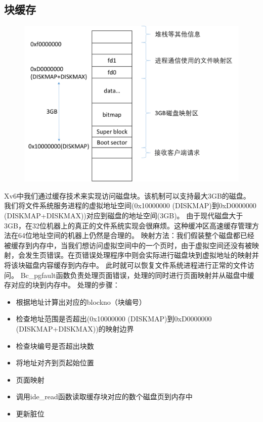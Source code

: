 \documentclass[a4paper,12pt]{report}
\begin{document}
\subsection{	块缓存}
\begin{figure}[H]
	\centering
	\includegraphics [width=1.0\textwidth]{figure//image152.png}
\end{figure}
Xv6中我们通过缓存技术来实现访问磁盘块。该机制可以支持最大3GB的磁盘。
我们将文件系统服务进程的虚拟地址空间(0x10000000 (DISKMAP)到0xD0000000 (DISKMAP+DISKMAX))对应到磁盘的地址空间(3GB)。
由于现代磁盘大于3GB，在32位机器上的真正的文件系统实现会很麻烦。这种缓冲区高速缓存管理方法在64位地址空间的机器上仍然是合理的。
映射方法：我们假装整个磁盘都已经被缓存到内存中，当我们想访问虚拟空间中的一个页时，由于虚拟空间还没有被映射，会发生页错误。在页错误处理程序中则会实际进行磁盘块到虚拟地址的映射并将该块磁盘内容缓存到内存中。
此时就可以恢复文件系统进程进行正常的文件访问。
Bc\_pgfault函数负责处理页面错误，处理的同时进行页面映射并从磁盘中缓存对应的块到内存中。
处理的步骤：
\begin{itemize}
  \item 根据地址计算出对应的blockno（块编号）
  \item 检查地址范围是否超出(0x10000000 (DISKMAP)到0xD0000000 (DISKMAP+DISKMAX))的映射边界
  \item 检查块编号是否超出块数
  \item 将地址对齐到页起始位置
  \item 页面映射
  \item 调用ide\_read函数读取缓存块对应的数个磁盘页到内存中
  \item 更新脏位
\end{itemize}
\end{document}
